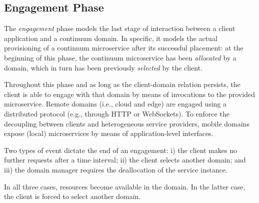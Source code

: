 

\subsection{Engagement Phase}\label{sec:A3-E-engagement}

The \textit{engagement} phase models the last stage of interaction between a client application and a continuum domain. In specific, it models the actual provisioning of a continuum microservice after its successful placement: at the beginning of this phase, the continuum microservice has been \textit{allocated} by a domain, which in turn has been previously \textit{selected} by the client. 

Throughout this phase and as long as the client-domain relation persists, the client is able to engage with that domain by means of invocations to the provided microservice. Remote domains (i.e., cloud and edge) are engaged using a distributed protocol (e.g., through HTTP or WebSockets). To enforce the decoupling between clients and heterogeneous service providers, mobile domains expose (local) microservices by means of application-level interfaces.

Two types of event dictate the end of an engagement: i) the client makes no further requests after a time interval; ii) the client selects another domain; and iii) the domain manager requires the deallocation of the service instance. 

In all three cases, resources become available in the domain. In the latter case, the client is forced to select another domain.







